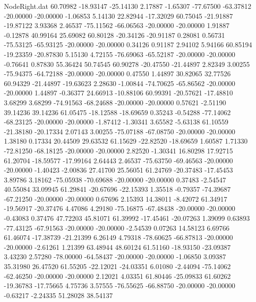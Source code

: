 \begin{filecontents}{NodeRight.dat}
  60.70982  -18.93147  -25.14130     2.17887   -1.65307  -77.67500  -63.37812  -20.00000  -20.00000   -1.06853    5.14130   22.82944  -17.32029
  60.75045  -21.91887  -19.87122     3.93368    2.46537  -75.11562  -66.06563  -20.00000  -20.00000    1.91887   -0.12878   40.99164   25.69082
  60.80128  -20.34126  -20.91187     0.28081    0.56731  -75.53125  -65.93125  -20.00000  -20.00000    0.34126    0.91187    2.94102    5.94166
  60.85194  -19.23359  -20.87830     5.15130    4.72155  -76.69063  -65.52187  -20.00000  -20.00000   -0.76641    0.87830   55.36424   50.74545
  60.90278  -20.47550  -21.44897     2.82349    3.00255  -75.94375  -64.72188  -20.00000  -20.00000    0.47550    1.44897   30.82065   32.77526
  60.94329  -21.44897  -19.63623     2.28630   -1.00844  -74.70625  -65.86562  -20.00000  -20.00000    1.44897   -0.36377   24.66913  -10.88106
  60.99391  -20.57621  -17.48810     3.68299    3.68299  -74.91563  -68.24688  -20.00000  -20.00000    0.57621   -2.51190   39.14236   39.14236
  61.05475  -18.12588  -18.69659     0.35243   -0.54288  -77.14062  -68.23125  -20.00000  -20.00000   -1.87412   -1.30341    3.65582   -5.63138
  61.10559  -21.38180  -20.17334     2.07143    3.00255  -75.07188  -67.08750  -20.00000  -20.00000    1.38180    0.17334   20.44509   29.63532
  61.15629  -22.82520  -18.69659     1.60587    1.71330  -72.81250  -68.18125  -20.00000  -20.00000    2.82520   -1.30341   16.80298   17.92715
  61.20704  -18.59577  -17.99164     2.64443    2.46537  -75.63750  -69.46563  -20.00000  -20.00000   -1.40423   -2.00836   27.41700   25.56051
  61.24769  -20.37483  -17.45453     3.89786    3.18162  -75.05938  -70.69688  -20.00000  -20.00000    0.37483   -2.54547   40.55084   33.09945
  61.29841  -20.67696  -22.15393     1.35518   -0.79357  -74.39687  -67.21250  -20.00000  -20.00000    0.67696    2.15393   14.38011   -8.42072
  61.34917  -19.56917  -20.37476     4.47086    4.29180  -75.16875  -67.48438  -20.00000  -20.00000   -0.43083    0.37476   47.72203   45.81071
  61.39992  -17.45461  -20.07263     1.39099    0.63893  -77.43125  -67.91563  -20.00000  -20.00000   -2.54539    0.07263   14.58123    6.69766
  61.46074  -17.38739  -21.21399     6.26149    4.79318  -78.60625  -66.87813  -20.00000  -20.00000   -2.61261    1.21399   63.48944   48.60124
  61.51160  -18.93150  -23.09387     3.43230    2.57280  -78.00000  -64.58437  -20.00000  -20.00000   -1.06850    3.09387   35.31980   26.47520
  61.55205  -22.12021  -24.03351     6.01080   -2.44094  -75.14062  -62.46250  -20.00000  -20.00000    2.12021    4.03351   61.80446  -25.09833
  61.60262  -19.36783  -17.75665     4.75736    3.57555  -76.55625  -66.88750  -20.00000  -20.00000   -0.63217   -2.24335   51.28028   38.54137

\end{filecontents}
